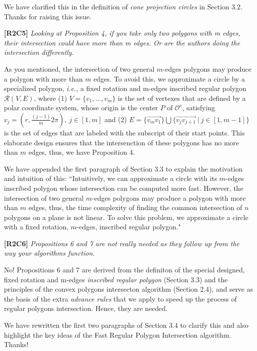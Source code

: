 \documentclass{letter}
\newcommand{\ie}{\emph{i.e.,}\xspace}
\newcommand{\pcircle}[1]{{$\mathcal{O}^c{#1}$}}
\begin{document}
We have clarified this in the definition of \emph{cone projection circles} in Section 3.2. Thanks for raising this issue.

\textbf{[R2C5]} \emph{Looking at Proposition 4, if you take only two polygons with m edges, their intersection could have more than m edges. Or are the authors doing the intersection differently.}

As you mentioned, the intersection of two {general} $m$-edges polygons may produce a polygon with more than $m$ edges. To avoid this, we approximate a circle by a {specialized} polygon, \ie a fixed rotation and m-edges inscribed regular polygon $\mathcal{R}(V, E)$,
where (1) $V=\{v_1, \ldots, v_{m}\}$ is the set of vertexes that are defined by a polar coordinate system, whose origin is the center $P$ of \pcircle{}, satisfying $v_j = (r, \frac{(j-1)}{m}2\pi), ~j \in [1, m]$
and (2) $E= \{\overrightarrow{v_mv_1}\} \bigcup \{\overrightarrow{v_jv_{j+1}}\ |\ j\in [1, m-1]\}$ is the set of edges that are labeled with the subscript of their start points.
This elaborate design ensures that the intersenction of these polygons has no more than $m$ edges, thus, we have Proposition 4.

We have appended the first paragraph of Section 3.3 to explain the motivation and intuition of this: ``Intuitively, we can approximate a circle with its $m$-edges inscribed polygon {whose intersection can be computed more fast}. However, the intersection of two general $m$-edges polygons may produce a polygon with more than $m$ edges, thus, the time complexity of finding the common intersection of $n$ polygons on a plane is not linear. To solve this problem, we approximate a circle with a fixed rotation, $m$-edges, inscribed regular polygon."



\textbf{[R2C6]} \emph{Propositions 6 and 7 are not really needed as they follow up from the way your algorithms function.}

No! Propositions 6 and 7 are derived from the definiton of the special designed, fixed rotation and m-edges \emph{inscribed regular polygon} (Section 3.3) and the principles of the convex polygons intersecton algorithm (Section 2.4), and serve as the basis of the extra \emph{advance rules} that we apply to speed up the process of regular polygons intersection. Hence, they are needed.
 
We have rewritten the first two paragraphs of Section 3.4 to clarify this and also highlight the key ideas of the Fast Regular Polygon Intersection algorithm. Thanks!
\end{document}
